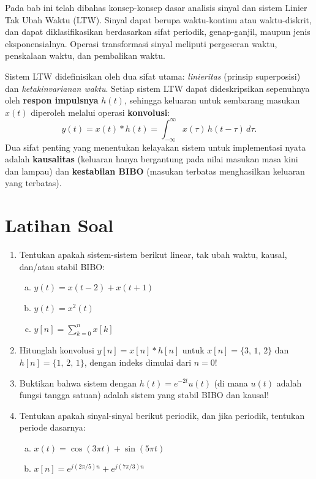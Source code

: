 Pada bab ini telah dibahas konsep-konsep dasar analisis sinyal dan sistem Linier Tak Ubah Waktu (LTW). Sinyal dapat berupa waktu-kontinu atau waktu-diskrit, dan dapat diklasifikasikan berdasarkan sifat periodik, genap-ganjil, maupun jenis eksponensialnya. Operasi transformasi sinyal meliputi pergeseran waktu, penskalaan waktu, dan pembalikan waktu.

Sistem LTW didefinisikan oleh dua sifat utama: \textit{linieritas} (prinsip superposisi) dan \textit{ketakinvarianan waktu}. Setiap sistem LTW dapat dideskripsikan sepenuhnya oleh \textbf{respon impulsnya} $h(t)$, sehingga keluaran untuk sembarang masukan $x(t)$ diperoleh melalui operasi \textbf{konvolusi}:
\[
y(t) = x(t) * h(t) = \int_{-\infty}^{\infty} x(\tau)\,h(t-\tau)\,d\tau.
\]
Dua sifat penting yang menentukan kelayakan sistem untuk implementasi nyata adalah \textbf{kausalitas} (keluaran hanya bergantung pada nilai masukan masa kini dan lampau) dan \textbf{kestabilan BIBO} (masukan terbatas menghasilkan keluaran yang terbatas).

\section*{Latihan Soal}

\begin{enumerate}
  \item Tentukan apakah sistem-sistem berikut linear, tak ubah waktu, kausal, dan/atau stabil BIBO:
  \begin{enumerate}[(a)]
    \item $y(t) = x(t-2) + x(t+1)$
    \item $y(t) = x^2(t)$
    \item $y[n] = \displaystyle\sum_{k=0}^{n} x[k]$
  \end{enumerate}
  \item Hitunglah konvolusi $y[n] = x[n] * h[n]$ untuk $x[n] = \{3,\,1,\,2\}$ dan $h[n] = \{1,\,2,\,1\}$, dengan indeks dimulai dari $n=0$!
  \item Buktikan bahwa sistem dengan $h(t) = e^{-2t}u(t)$ (di mana $u(t)$ adalah fungsi tangga satuan) adalah sistem yang stabil BIBO dan kausal!
  \item Tentukan apakah sinyal-sinyal berikut periodik, dan jika periodik, tentukan periode dasarnya:
  \begin{enumerate}[(a)]
    \item $x(t) = \cos(3\pi t) + \sin(5\pi t)$
    \item $x[n] = e^{j(2\pi/5)n} + e^{j(7\pi/3)n}$
  \end{enumerate}
\end{enumerate}

